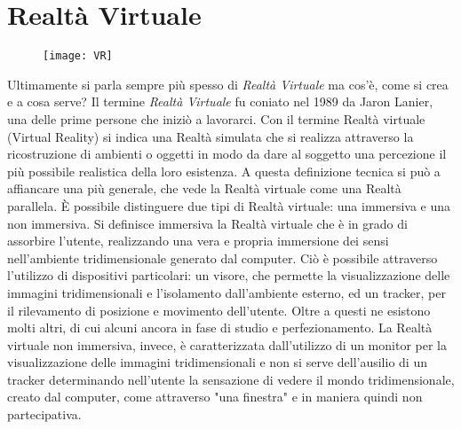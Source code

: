 \chapter{Realtà Virtuale}
\label{VR}

 \begin{figure}[htb]
    \centering
    \texttt{[image: VR]}
\end{figure}
\noindent Ultimamente si parla sempre più spesso di \textit{Realtà Virtuale} ma cos'è, come si crea e a cosa serve?
Il termine \textit{Realtà Virtuale} fu coniato nel 1989 da Jaron Lanier, una delle prime persone che iniziò a lavorarci. Con il termine Realtà virtuale (Virtual Reality) si indica una Realtà simulata che si realizza attraverso la ricostruzione di ambienti o oggetti in modo da dare al soggetto una percezione il più possibile realistica della loro esistenza. A questa definizione tecnica si può a affiancare una più generale, che vede la Realtà virtuale come una Realtà parallela. È possibile distinguere due tipi di Realtà virtuale: una immersiva e una non immersiva. Si definisce immersiva la Realtà virtuale che è in grado di assorbire l'utente, realizzando una vera e propria immersione dei sensi nell'ambiente tridimensionale generato dal computer. Ciò è possibile attraverso l'utilizzo di dispositivi particolari: un visore, che permette la visualizzazione delle immagini tridimensionali e l'isolamento dall'ambiente esterno, ed un tracker, per il rilevamento di posizione e movimento dell'utente. Oltre a questi ne esistono molti altri, di cui alcuni ancora in fase di studio e perfezionamento. La Realtà virtuale non immersiva, invece, è caratterizzata dall'utilizzo di un monitor per la visualizzazione delle immagini tridimensionali e non si serve dell'ausilio di un tracker determinando nell'utente la sensazione di vedere il mondo tridimensionale, creato dal computer, come attraverso "una finestra" e in maniera quindi non partecipativa.
